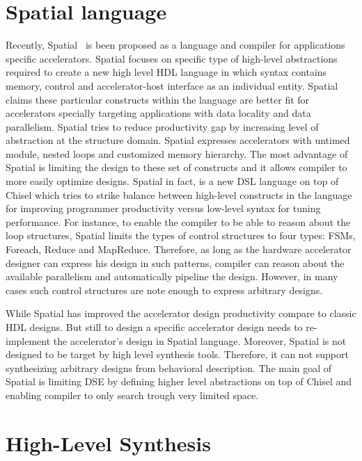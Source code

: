 \section{Spatial language}
Recently, Spatial~\cite{david_PLDI_2018_spatial} is been proposed as a language and compiler for applications specific accelerators.
Spatial focuses on specific type of high-level abstractions required to create a new high level HDL language in which syntax contains memory, control and accelerator-host interface as an individual entity.
Spatial claims these particular constructs within the language are better fit for accelerators specially targeting applications with data locality and data parallelism.
Spatial tries to reduce productivity gap by increasing level of abstraction at the structure domain. Spatial expresses accelerators with untimed module, nested loops and customized memory hierarchy.
The most advantage of Spatial is limiting the design to these set of constructs and it allows compiler to more easily optimize designs.
Spatial in fact, is a new DSL language on top of Chisel which tries to strike balance between high-level constructs in the language for improving programmer productivity versus low-level syntax for tuning performance. 
For instance, to enable the compiler to be able to reason about the loop structures, Spatial limits the types of control structures to four types: FSMs, Foreach, Reduce and MapReduce. 
Therefore, as long as the hardware accelerator designer can express his design in such patterns, compiler can reason about the available parallelism and automatically pipeline the design.
However, in many cases such control structures are note enough to express arbitrary designs.

While Spatial has improved the accelerator design productivity compare to classic HDL designs.
But still to design a specific accelerator design needs to re-implement the accelerator's design in Spatial language. Moreover, Spatial is not designed to be target by high level synthesis tools.
Therefore, it can not support synthesizing arbitrary designs from behavioral description.
The main goal of Spatial is limiting DSE by defining higher level abstractions on top of Chisel and enabling compiler to only search trough very limited space.

\section{High-Level Synthesis}

